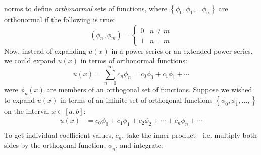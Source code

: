  norms to define \emph{orthonormal} sets of functions, where $\left\{ \phi_0, \phi_1, \dots \phi_n\right\}$ are orthonormal if the following is true:
\begin{equation*}
\left(\phi_n,\phi_m\right) = 
\begin{cases}
0 & n\ne m \\
1 & n=m
\end{cases}
\end{equation*}
Now, instead of expanding $u(x)$ in a power series or an extended power series, we could expand $u(x)$ in terms of orthonormal functions:
\begin{equation*}
u(x) = \sum\limits_{n=0}^{\infty} c_n \phi_n = c_0\phi_0 + c_1\phi_1 + \cdots
\end{equation*}
were $\phi_n(x)$ are members of an orthogonal set of functions. Suppose we wished to expand $u(x)$ in terms of an infinite set of orthogonal functions $\left\{\phi_0,\phi_1,\dots,\right\}$ on the interval $x\in[a,b]$:
\begin{align*}
u(x) &= c_0\phi_0 + c_1\phi_1 + c_2\phi_2 + \cdots + c_n\phi_n + \cdots \\
\end{align*}
To get individual coefficient values, $c_n$, take the inner product---i.e. multiply both sides by the orthogonal function, $\phi_n$, and integrate:
